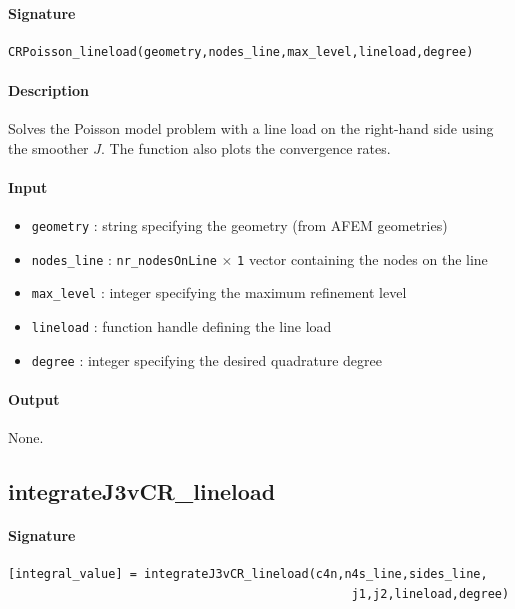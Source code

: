 \documentclass[11pt,a4paper]{article}
\begin{document}
\paragraph{Signature}
\begin{verbatim}
CRPoisson_lineload(geometry,nodes_line,max_level,lineload,degree)
\end{verbatim}

\paragraph{Description}
Solves the Poisson model problem with a line load on the right-hand side 
using the smoother $J$. The function also plots the convergence rates.

\paragraph{Input}
\begin{itemize}
    \item \texttt{geometry} : string specifying the geometry (from AFEM geometries)
    \item \texttt{nodes\_line} : \texttt{nr\_nodesOnLine} \(\times\) \texttt{1} vector containing the nodes on the line
    \item \texttt{max\_level} : integer specifying the maximum refinement level
    \item \texttt{lineload} : function handle defining the line load
    \item \texttt{degree} : integer specifying the desired quadrature degree
\end{itemize}

\paragraph{Output}
None.


\subsection{integrateJ3vCR\_lineload}

\paragraph{Signature}
\begin{verbatim}
[integral_value] = integrateJ3vCR_lineload(c4n,n4s_line,sides_line,
                                                j1,j2,lineload,degree)
\end{verbatim}
\end{document}
